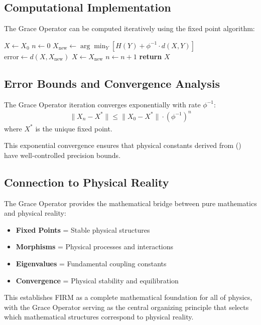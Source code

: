 \subsection{Computational Implementation}

The Grace Operator can be computed iteratively using the fixed point algorithm:

\begin{algorithm}[H]
\begin{algorithmic}[1]
    \State $X \gets X_0$
    \State $n \gets 0$
    \Repeat
        \State $X_{\text{new}} \gets \arg\min_{Y} [H(Y) + \phi^{-1} \cdot d(X, Y)]$
        \State $\text{error} \gets d(X, X_{\text{new}})$
        \State $X \gets X_{\text{new}}$
        \State $n \gets n + 1$
    \State \textbf{return} $X$
\EndProcedure
\end{algorithmic}
\end{algorithm}

\subsection{Error Bounds and Convergence Analysis}

\begin{theorem}
The Grace Operator iteration converges exponentially with rate $\phi^{-1}$:
\begin{align}
\|X_n - X^*\| \leq \|X_0 - X^*\| \cdot (\phi^{-1})^n
\end{align}
where $X^*$ is the unique fixed point.
\end{theorem}

This exponential convergence ensures that physical constants derived from () have well-controlled precision bounds.

\subsection{Connection to Physical Reality}

The Grace Operator provides the mathematical bridge between pure mathematics and physical reality:

\begin{itemize}
    \item \textbf{Fixed Points} = Stable physical structures
    \item \textbf{Morphisms} = Physical processes and interactions  
    \item \textbf{Eigenvalues} = Fundamental coupling constants
    \item \textbf{Convergence} = Physical stability and equilibration
\end{itemize}

This establishes FIRM as a complete mathematical foundation for all of physics, with the Grace Operator serving as the central organizing principle that selects which mathematical structures correspond to physical reality.